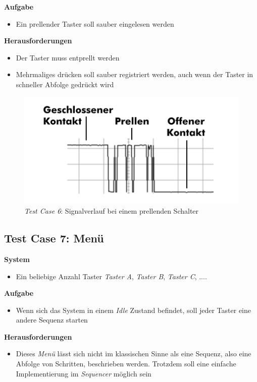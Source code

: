 \textbf{Aufgabe}
\begin{itemize}
\item Ein prellender Taster soll sauber eingelesen werden
\end{itemize}

\textbf{Herausforderungen}
\begin{itemize}
\item Der Taster muss entprellt werden
\item Mehrmaliges drücken soll sauber registriert werden, auch wenn der Taster in schneller Abfolge gedrückt wird
\end{itemize}

\begin{figure}[]
\centering
\includegraphics[angle=0]{images/Testcase06.png}
\caption{\textit{Test Case 6}: Signalverlauf bei einem prellenden Schalter}
\label{Testcase06Picture}
\end{figure}


\subsection{Test Case 7: Menü}
\textbf{System}
\begin{itemize}
\item Ein beliebige Anzahl Taster \textit{Taster A}, \textit{Taster B}, \textit{Taster C}, ....
\end{itemize}

\textbf{Aufgabe}
\begin{itemize}
\item Wenn sich das System in einem \textit{Idle} Zustand befindet, soll jeder Taster eine andere Sequenz starten
\end{itemize}

\textbf{Herausforderungen}
\begin{itemize}
\item Dieses \textit{Menü} lässt sich nicht im klassischen Sinne als eine Sequenz, also eine Abfolge von Schritten, beschrieben werden. Trotzdem soll eine einfache Implementierung im \textit{Sequencer} möglich sein
\end{itemize}


